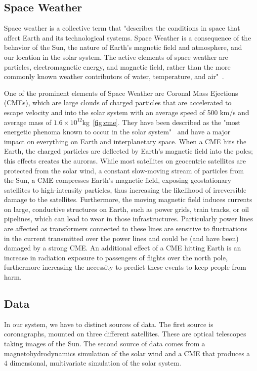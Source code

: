 \documentclass[journal]{vgtc}                %
\begin{document}
\subsection{Space Weather}
Space weather is a collective term that "describes the conditions in space that affect Earth and its technological systems. Space Weather is a consequence of the behavior of the Sun, the nature of Earth’s magnetic field and atmosphere, and our location in the solar system. The active elements of space weather are particles, electromagnetic energy, and magnetic field, rather than the more commonly known weather contributors of water, temperature, and air"~\cite{noaaprofile}.

One of the prominent elements of Space Weather are Coronal Mass Ejections (CMEs), which are large clouds of charged particles that are accelerated to escape velocity and into the solar system with an average speed of 500 km/s and average mass of $1.6 \times 10^12$kg~\ref{fig:cme}. They have been described as the "most energetic phenoma known to occur in the solar system"~\cite{Kahler:1987jt} and have a major impact on everything on Earth and interplanetary space. When a CME hits the Earth, the charged particles are deflected by Earth's magnetic field into the poles; this effects creates the auroras. While most satellites on geocentric satellites are protected from the solar wind, a constant slow-moving stream of particles from the Sun, a CME compresses Earth's magnetic field, exposing geostationary satellites to high-intensity particles, thus increasing the likelihood of irreversible damage to the satellites. Furthermore, the moving magnetic field induces currents on large, conductive structures on Earth, such as power grids, train tracks, or oil pipelines, which can lead to wear in those infrastructures. Particularly power lines are affected as transformers connected to these lines are sensitive to fluctuations in the current transmitted over the power lines and could be (and have been) damaged by a strong CME. An additional effect of a CME hitting Earth is an increase in radiation exposure to passengers of flights over the north pole, furthermore increasing the necessity to predict these events to keep people from harm.

\subsection{Data} \label{sec:data}
In our system, we have to distinct sources of data. The first source is coronagraphs, mounted on three different satellites. These are optical telescopes taking images of the Sun. The second source of data comes from a magnetohydrodynamics simulation of the solar wind and a CME that produces a 4 dimensional, multivariate simulation of the solar system.
\end{document}
